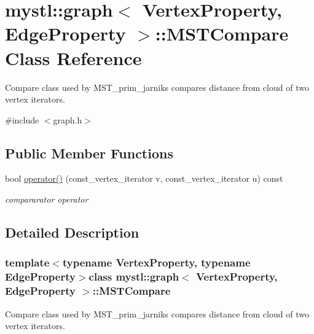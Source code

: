 \hypertarget{classmystl_1_1graph_1_1MSTCompare}{\section{mystl\+:\+:graph$<$ Vertex\+Property, Edge\+Property $>$\+:\+:M\+S\+T\+Compare Class Reference}
\label{classmystl_1_1graph_1_1MSTCompare}
}


Compare class used by M\+S\+T\+\_\+prim\+\_\+jarniks compares distance from cloud of two vertex iterators.  




{\ttfamily \#include $<$graph.\+h$>$}

\subsection*{Public Member Functions}
\begin{DoxyCompactItemize}
\item 
bool \hyperlink{classmystl_1_1graph_1_1MSTCompare_ac91ccaa0c8af200aa01fdc011eb644c2}{operator()} (const\+\_\+vertex\+\_\+iterator v, const\+\_\+vertex\+\_\+iterator u) const 
\begin{DoxyCompactList}\small\item\em compararator operator \end{DoxyCompactList}\end{DoxyCompactItemize}


\subsection{Detailed Description}
\subsubsection*{template$<$typename Vertex\+Property, typename Edge\+Property$>$class mystl\+::graph$<$ Vertex\+Property, Edge\+Property $>$\+::\+M\+S\+T\+Compare}

Compare class used by M\+S\+T\+\_\+prim\+\_\+jarniks compares distance from cloud of two vertex iterators. 

